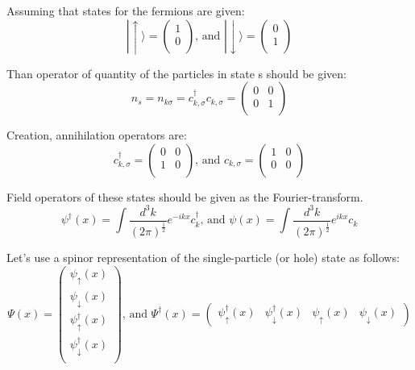 \documentclass{article}
\begin{document}
Assuming that states for the fermions are given:
\begin{equation}
    |\uparrow\rangle = 
    \begin{pmatrix}
        1 \\
        0 \\
    \end{pmatrix}
    \textrm{, and }
    |\downarrow\rangle = 
    \begin{pmatrix}
        0 \\
        1 \\
    \end{pmatrix}
\end{equation}

Than operator of quantity of the particles in state s should be given:
\begin{equation}
    n_s = n_{k\sigma} = c^{\dagger}_{k,\sigma}c_{k,\sigma} =
    \begin{pmatrix}
        0 & 0 \\
        0 & 1 \\
    \end{pmatrix}
\end{equation}

Creation, annihilation operators are:
\begin{equation}
    c^{\dagger}_{k, \sigma} = \begin{pmatrix}
        0 & 0 \\
        1 & 0 \\
    \end{pmatrix}
    \textrm{, and }
    c_{k, \sigma} = \begin{pmatrix}
        1 & 0 \\
        0 & 0 \\
    \end{pmatrix}
\end{equation}


Field operators of these states should be given as the Fourier-transform.
\begin{equation}
    \psi^{\dagger}(x) =
    \int{
        \frac{d^3k}{(2\pi)^\frac{1}{2}}e^{-ikx}c^{\dagger}_k
    }
    \textrm{, and }
    \psi(x) =
    \int{
        \frac{d^3k}{(2\pi)^\frac{1}{2}}e^{ikx}c_k
    }
\end{equation}


Let's use a spinor representation of the single-particle (or hole) state as follows:
\begin{equation}
\Psi(x)=
\begin{pmatrix}
    \psi_\uparrow(x) \\
    \psi_\downarrow(x) \\
    \psi^\dagger_\uparrow(x) \\
    \psi^\dagger_\downarrow(x) \\
\end{pmatrix}
\textrm{, and }
\Psi^\dagger(x)=
\begin{pmatrix}
    \psi^\dagger_\uparrow(x) & \psi^\dagger_\downarrow(x) & \psi_\uparrow(x) & \psi_\downarrow(x)
\end{pmatrix}
\end{equation}
\end{document}

